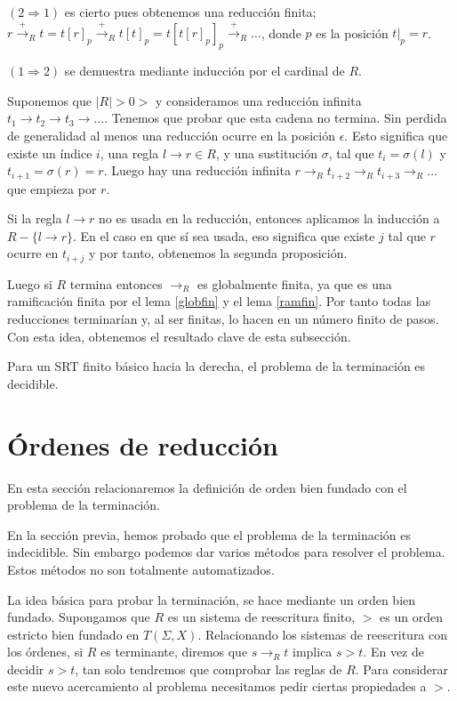 \begin{demo}
  $(2 \Rightarrow 1)$ es cierto pues obtenemos una reducción finita;
  $r\xrightarrow{+}_R t = t[r]_p \xrightarrow{+}_R t[t]_p =
  t[t[r]_p]_p \xrightarrow{+}_R \dots$, donde $p$ es la posición $t|_p = r$.
  
  $(1 \Rightarrow 2)$ se demuestra mediante inducción por el cardinal
  de $R$.

  Suponemos que $|R| >0>$ y consideramos una reducción infinita
  $t_1 \rightarrow t_2 \rightarrow t_3 \rightarrow \dots$. Tenemos que
  probar que esta cadena no termina. Sin perdida de generalidad al
  menos una reducción ocurre en la posición $\epsilon$. Esto significa
  que existe un índice $i$, una regla $l \rightarrow r \in R$, y una
  sustitución $\sigma$, tal que $t_i = \sigma(l)$ y
  $t_{i+1} = \sigma(r) = r$. Luego hay una reducción infinita
  $r \rightarrow_R t_{i+2} \rightarrow_R t_{i+3} \rightarrow_R \dots$
  que empieza por $r$.

  Si la regla $l \rightarrow r$ no es usada en la reducción, entonces
  aplicamos la inducción a $R - \{l \rightarrow r\}$. En el caso en
que sí sea usada, eso significa que existe $j$ tal que $r$ ocurre en
$t_{i+j}$ y por tanto, obtenemos la segunda proposición.
\end{demo}

Luego si $R$ termina entonces $\rightarrow_R$ es globalmente finita,
ya que es una ramificación finita por el lema \ref{globfin} y el lema
\ref{ramfin}. Por tanto todas las reducciones terminarían y, al ser
finitas, lo hacen en un número finito de pasos. Con esta idea,
obtenemos el resultado clave de esta subsección.

\begin{teor}
  Para un SRT finito básico hacia la derecha, el problema de la
  terminación es decidible.
\end{teor}

\section{Órdenes de reducción}

En esta sección relacionaremos la definición de orden bien fundado con
el problema de la terminación.

En la sección previa, hemos probado que el problema de la terminación
es indecidible. Sin embargo podemos dar varios métodos para resolver
el problema. Estos métodos no son totalmente automatizados.

La idea básica para probar la terminación, se hace mediante un orden
bien fundado. Supongamos que $R$ es un sistema de reescritura finito,
$>$ es un orden estricto bien fundado en $T(\Sigma, X)$. Relacionando
los sistemas de reescritura con los órdenes, si $R$ es terminante,
diremos que $s \rightarrow_R t$ implica $s > t$. En vez de decidir $s > t$,
tan solo tendremos que comprobar las reglas de $R$. Para considerar
este nuevo acercamiento al problema necesitamos pedir ciertas
propiedades a $>$.

